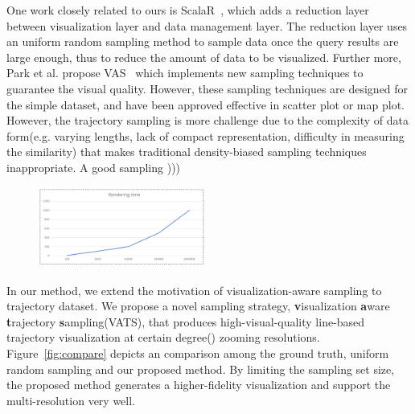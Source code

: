 One work closely related to ours is ScalaR~\cite{battle2013dynamic}, which adds a reduction layer between visualization layer and data management layer. The reduction layer uses an uniform random sampling method to sample data once the query results are large enough, thus to reduce the amount of data to be visualized.
Further more, Park et al. propose VAS~\cite{park2016visualization} which implements new sampling techniques to guarantee the visual quality. However, these sampling techniques are designed for the simple dataset, and have been approved effective in scatter plot or map plot. However, the trajectory sampling is more challenge due to the complexity of data form(e.g. varying lengths, lack of compact representation, difficulty in measuring the similarity) that makes traditional density-biased sampling techniques inappropriate. A good sampling )))


\begin{figure}[t]
	\centering
	\includegraphics[width=0.49\textwidth]{pictures/introduction/rendering.png}
	\vspace{-5mm}
	\caption{ }
	\vspace{-5mm}
	\label{fig:rendering_time}
\end{figure}


In our method, we extend the motivation of visualization-aware sampling to trajectory dataset. We propose a novel sampling strategy, \textbf{v}isualization \textbf{a}ware \textbf{t}rajectory \textbf{s}ampling(VATS), that produces high-visual-quality line-based trajectory visualization at certain degree() zooming resolutions. 
Figure~\ref{fig:compare} depicts an comparison among the ground truth,  uniform random sampling and our proposed method. By limiting the sampling set size, the proposed method generates a higher-fidelity visualization and support the multi-resolution very well.   

